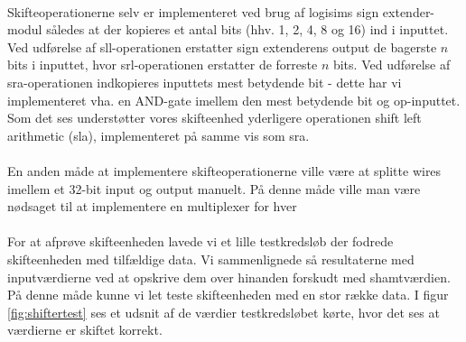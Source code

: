 \documentclass[10pt,a4paper,danish]{article}
\begin{document}
\paragraph{}
Skifteoperationerne selv er implementeret ved brug af logisims sign extender-modul således at 
der kopieres et antal bits (hhv. 1, 2, 4, 8 og 16) ind i inputtet. Ved udførelse
af sll-operationen erstatter sign extenderens output de bagerste $n$ bits i inputtet, hvor 
srl-operationen erstatter de forreste $n$ bits. Ved udførelse af sra-operationen indkopieres
inputtets mest betydende bit - dette har vi implementeret vha. en AND-gate imellem den mest
betydende bit og op-inputtet. Som det ses understøtter vores skifteenhed yderligere 
operationen shift left arithmetic (sla), implementeret på samme vis som sra.

\paragraph{}
En anden måde at implementere skifteoperationerne ville være at splitte wires imellem
et 32-bit input og output manuelt. På denne måde ville man være nødsaget til at implementere
en multiplexer for hver 

\paragraph{}
For at afprøve skifteenheden lavede vi et lille testkredsløb der fodrede skifteenheden med tilfældige data.
Vi sammenlignede så resultaterne med inputværdierne ved at opskrive dem over hinanden forskudt med shamtværdien.
På denne måde kunne vi let teste skifteenheden med en stor række data.
I figur \ref{fig:shiftertest} ses et udsnit af de værdier testkredsløbet kørte, hvor det ses at værdierne er skiftet korrekt.
\end{document}
